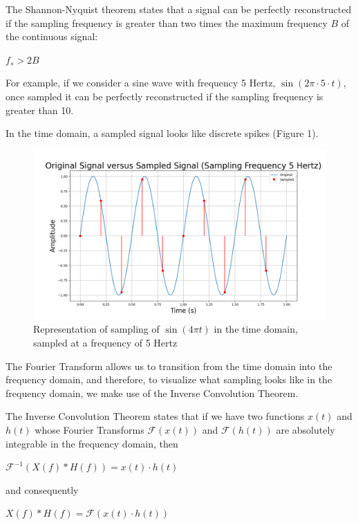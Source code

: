 \documentclass{article}
\begin{document}
The Shannon-Nyquist theorem states that a signal can be perfectly reconstructed if the sampling frequency is greater than two times the maximum frequency $B$ of the continuous signal:
\begin{center}
    \begin{math}
        f_s > 2B
    \end{math}  
\end{center}
For example, if we consider a sine wave with frequency 5 Hertz, $\sin(2\pi \cdot 5 \cdot t)$, once sampled it can be perfectly reconstructed if the sampling frequency is greater than 10.


In the time domain, a sampled signal looks like discrete spikes (Figure 1). 
\begin{figure}
    \includegraphics[width=\linewidth]{ogvssampled_BIG.png}
    \caption{Representation of sampling of $\sin(4\pi t)$ in the time domain, sampled at a frequency of 5 Hertz}
    \label{fig:grid}

\end{figure}
The Fourier Transform allows us to transition from the time domain into the frequency domain, and therefore, to visualize what sampling looks like in the frequency domain, we make use of the Inverse Convolution Theorem.

The Inverse Convolution Theorem states that if we have two functions $x(t)$ and $h(t)$ whose Fourier Transforms $\mathcal{F}(x(t))$ and $\mathcal{F}(h(t))$ are absolutely integrable in the frequency domain,
then 
\begin{center}
    \begin{math}
        \mathcal{F}^{-1} \left(X(f) * H(f) \right) = x(t) \cdot h(t)
    \end{math}  
\end{center}
and consequently %
\begin{center}
    \begin{math}
        X(f) * H(f) = \mathcal{F}\left(x(t) \cdot h(t)\right)
    \end{math}  
\end{center}
\end{document}
